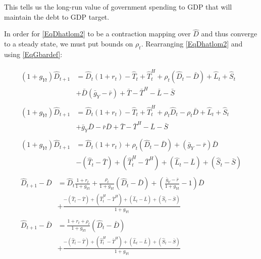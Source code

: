 \documentclass[letterpaper,12pt]{article}
\theoremstyle{definition}
\begin{document}
\begin{spacing}{1.5}
      This tells us the long-run value of government spending to GDP that will maintain the debt to GDP target.

      In order for \eqref{EqDhatlom2} to be a contraction mapping over $\hat D$ and thus converge to a steady state, we must put bounds on $\rho_t$.  Rearranging \eqref{EqDhatlom2} and using \eqref{EqGbardef}:

      \begin{align}
        \begin{split}
        (1+g_{Yt}) \hat D_{t+1} & = \hat D_t (1+r_t) - \hat T_t + \hat T^H_t + \rho_t (\hat D_t - \bar D) + \hat L_t + \hat S_t \\
        & + \bar D(\bar g_{Y} - \bar r) + \bar T - \bar T^H - \bar L - \bar S
        \end{split} \nonumber \\
        \begin{split}
        (1+g_{Yt}) \hat D_{t+1} & = \hat D_t (1+r_t) - \hat T_t + \hat T^H_t + \rho_t \hat D_t - \rho_t \bar D + \hat L_t + \hat S_t \\
        & + \bar g_Y \bar D - \bar r \bar D + \bar T - \bar T^H - \bar L - \bar S
        \end{split} \nonumber \\
        \begin{split}
        (1+g_{Yt}) \hat D_{t+1} & =  \hat D_t (1+r_t) + \rho_t (\hat D_t -\bar D) + (\bar g_Y - \bar r ) \bar D \\
        & - (\hat T_t - \bar T) + (\hat T^H_t -\bar T^H) + (\hat L_t -\bar L) + (\hat S_t -\bar S)
        \end{split} \nonumber \\
        \begin{split}
        \hat D_{t+1} - \bar D & = \hat D_t \frac{1+r_t}{1+g_{Yt}} + \frac{\rho_t}{1+g_{Yt}} (\hat D_t -\bar D) + \left( \frac{\bar g_Y - \bar r}{1+g_{Yt}} - 1 \right) \bar D \\
        & + \frac{-(\hat T_t - \bar T) + (\hat T^H_t -\bar T^H) + (\hat L_t -\bar L) + (\hat S_t -\bar S)}{1+g_{Yt}}
        \end{split}  \nonumber \\
        \begin{split} 
        \hat D_{t+1} - \bar D & = \frac{1+r_t+\rho_t}{1+g_{Yt}} (\hat D_t -\bar D) \\
        & + \frac{-(\hat T_t - \bar T) + (\hat T^H_t -\bar T^H) + (\hat L_t -\bar L) + (\hat S_t -\bar S)}{1+g_{Yt}}
        \end{split} 
        \label{EqStab}
      \end{align}


\end{spacing}
\end{document}
